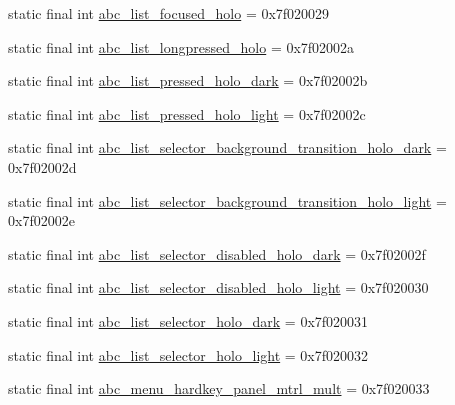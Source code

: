 \begin{CompactItemize}
\item 
static final int \hyperlink{classandroid_1_1support_1_1graphics_1_1drawable_1_1animated_1_1_r_1_1drawable_e9dff2e1d8d3f2fc498898b10457f711}{abc\_\-list\_\-focused\_\-holo} = 0x7f020029
\item 
static final int \hyperlink{classandroid_1_1support_1_1graphics_1_1drawable_1_1animated_1_1_r_1_1drawable_1d8eb9f63aeaa7859678ce33172ff53f}{abc\_\-list\_\-longpressed\_\-holo} = 0x7f02002a
\item 
static final int \hyperlink{classandroid_1_1support_1_1graphics_1_1drawable_1_1animated_1_1_r_1_1drawable_d97d6e720336cd6b13f001d863078014}{abc\_\-list\_\-pressed\_\-holo\_\-dark} = 0x7f02002b
\item 
static final int \hyperlink{classandroid_1_1support_1_1graphics_1_1drawable_1_1animated_1_1_r_1_1drawable_a1ffb4b1e2c0fb58798f5567c8abff56}{abc\_\-list\_\-pressed\_\-holo\_\-light} = 0x7f02002c
\item 
static final int \hyperlink{classandroid_1_1support_1_1graphics_1_1drawable_1_1animated_1_1_r_1_1drawable_4f303ae0c7c1d4a6354ab4a9a12795b3}{abc\_\-list\_\-selector\_\-background\_\-transition\_\-holo\_\-dark} = 0x7f02002d
\item 
static final int \hyperlink{classandroid_1_1support_1_1graphics_1_1drawable_1_1animated_1_1_r_1_1drawable_eb0af0f3439fa0321dd577b28c38be44}{abc\_\-list\_\-selector\_\-background\_\-transition\_\-holo\_\-light} = 0x7f02002e
\item 
static final int \hyperlink{classandroid_1_1support_1_1graphics_1_1drawable_1_1animated_1_1_r_1_1drawable_4f162f601d93c70d9e80963ab4a43baa}{abc\_\-list\_\-selector\_\-disabled\_\-holo\_\-dark} = 0x7f02002f
\item 
static final int \hyperlink{classandroid_1_1support_1_1graphics_1_1drawable_1_1animated_1_1_r_1_1drawable_92f1ad91de017188622f77c0f4fceef8}{abc\_\-list\_\-selector\_\-disabled\_\-holo\_\-light} = 0x7f020030
\item 
static final int \hyperlink{classandroid_1_1support_1_1graphics_1_1drawable_1_1animated_1_1_r_1_1drawable_cd9fe3e1174070c889ea01b27e96fabf}{abc\_\-list\_\-selector\_\-holo\_\-dark} = 0x7f020031
\item 
static final int \hyperlink{classandroid_1_1support_1_1graphics_1_1drawable_1_1animated_1_1_r_1_1drawable_80e405eed8529b8f051482abef2dbf79}{abc\_\-list\_\-selector\_\-holo\_\-light} = 0x7f020032
\item 
static final int \hyperlink{classandroid_1_1support_1_1graphics_1_1drawable_1_1animated_1_1_r_1_1drawable_cce5bd794ae600f7114651db7521e080}{abc\_\-menu\_\-hardkey\_\-panel\_\-mtrl\_\-mult} = 0x7f020033

\end{CompactItemize}
